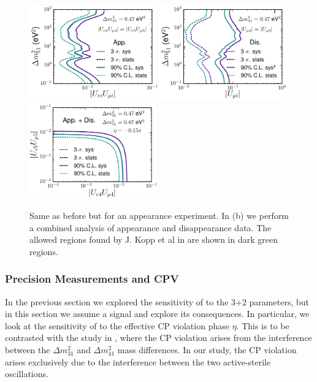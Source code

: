 \begin{figure}
\includegraphics[width=0.49\textwidth]{figs/App_dm_UU.pdf}
\includegraphics[width=0.49\textwidth]{figs/Dis_dm_UU.pdf}
\includegraphics[width=0.49\textwidth]{figs/App_dm_UU_UU.pdf}
\caption{Same as before but for an appearance experiment. In (b) we perform a combined analysis of appearance and disappearance data. The allowed regions found by J. Kopp et al in \cite{Kopp2013} are shown in dark green regions. \label{fig:3+2sens_app} }
\end{figure}


\subsubsection{Precision Measurements and CPV}

	In the previous section we explored the sensitivity of \nus to the 3+2 parameters, but in this section we assume a signal and explore its consequences. In particular, we look at the sensitivity of \nus to the effective CP violation phase $\eta$. This is to be contrasted with the study in \cite{DeGouvea2015a}, where the CP violation arises from the interference between the $\Delta m^2_{31}$ and $\Delta m^2_{41}$ mass differences. In our study, the CP violation arises exclusively due to the interference between the two active-sterile oscillations.


